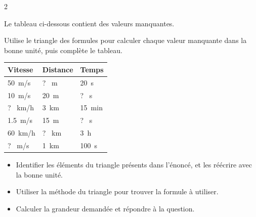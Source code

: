 \documentclass[11pt,a5paper,landscape]{article}
\begin{document}

\setlength{\columnsep}{1cm}

\begin{multicols*}{2}

\setcounter{numexercice}{5}


\exercice{}

Le tableau ci-dessous contient des valeurs manquantes.

Utilise le triangle des formules pour calculer chaque valeur manquante dans la bonne unité, puis complète le tableau.

\renewcommand{\arraystretch}{1.5}
\begin{tabular}{|>{\centering\arraybackslash}m{3cm}|>{\centering\arraybackslash}m{3cm}|>{\centering\arraybackslash}m{3cm}|}
\hline
\rowcolor{gray!30}
\textbf{Vitesse} & \textbf{Distance} & \textbf{Temps} \\
\hline
\SI{50}{\meter/\second}    & ? \SI{}{\meter}              & \SI{20}{\second} \\
\hline
\SI{10}{\meter/\second}    & \SI{20}{\meter}            & ? \SI{}{\second} \\
\hline
? \SI{}{\kilo\meter/\hour}   & \SI{3}{\kilo\meter}        & \SI{15}{\minute} \\
\hline
\SI{1.5}{\meter/\second}   & \SI{15}{\meter}            & ? \SI{}{\second} \\
\hline
\SI{60}{\kilo\meter/\hour} & ? \SI{}{\kilo\meter}         & \SI{3}{\hour} \\
\hline
? \SI{}{\meter/\second}      & \SI{1}{\kilo\meter}        & \SI{100}{\second} \\
\hline
\end{tabular}







\begin{itemize}
    \item Identifier les éléments du triangle présents dans l'énoncé, et les réécrire avec la bonne unité.
    \item Utiliser la méthode du triangle pour trouver la formule à utiliser.
    \item Calculer la grandeur demandée et répondre à la question.
\end{itemize}


\end{multicols*}
\end{document}
